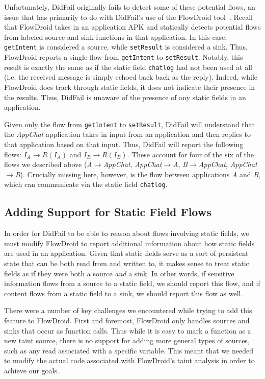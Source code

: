 Unfortunately, DidFail originally fails to detect some of these potential flows, an issue that has primarily to do with DidFail's use of the FlowDroid tool~\cite{flowdroid}. Recall that FlowDroid takes in an application APK and statically detects potential flows from labeled source and sink functions in that application. In this case, \texttt{getIntent} is considered a source, while \texttt{setResult} is considered a sink. Thus, FlowDroid reports a single flow from \texttt{getIntent} to \texttt{setResult}. Notably, this result is exactly the same as if the static field \texttt{chatlog} had not been used at all (i.e. the received message is simply echoed back back as the reply). Indeed, while FlowDroid does track through static fields, it does not indicate their presence in the results. Thus, DidFail is unaware of the presence of any static fields in an application.

Given only the flow from \texttt{getIntent} to \texttt{setResult}, DidFail will understand that the \emph{AppChat} application takes in input from an application and then replies to that application based on that input. Thus, DidFail will report the following flows: $I_A\rightarrow R(I_A)$ and $I_B\rightarrow R(I_B)$. These account for four of the six of the flows we described above (\emph{A$\rightarrow$AppChat}, \emph{AppChat$\rightarrow$A}, \emph{B$\rightarrow$AppChat}, \emph{AppChat$\rightarrow$B}). Crucially missing here, however, is the flow between applications \emph{A} and \emph{B}, which can communicate via the static field \texttt{chatlog}. 

\subsection{Adding Support for Static Field Flows}

In order for DidFail to be able to reason about flows involving static fields, we must modify FlowDroid to report additional information about how static fields are used in an application. Given that static fields serve as a sort of persistent state that can be both read from and written to, it makes sense to treat static fields as if they were both a source \emph{and} a sink. In other words, if sensitive information flows from a source to a static field, we should report this flow, and if content flows from a static field to a sink, we should report this flow as well.

There were a number of key challenges we encountered while trying to add this feature to FlowDroid. First and foremost, FlowDroid only handles sources and sinks that occur as function calls. Thus while it is easy to mark a function as a new taint source, there is no support for adding more general types of sources, such as any read associated with a specific variable. This meant that we needed to modify the actual code associated with FlowDroid's taint analysis in order to achieve our goals.

